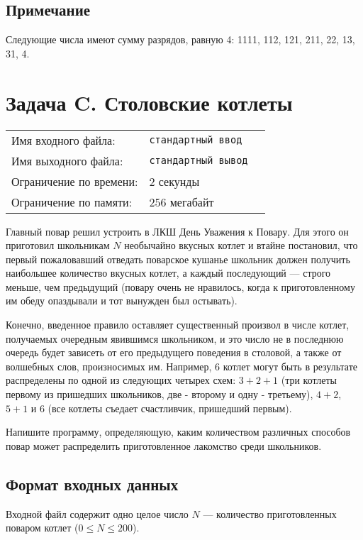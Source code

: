 \documentclass[12pt]{scrartcl}
\newcommand{\inputFile}{стандартный ввод}
\newcommand{\outputFile}{стандартный вывод}
\begin{document}
\subsection*{Примечание}
Следующие числа имеют сумму разрядов, равную 4: 1111, 112, 121, 211, 22, 13, 31, 4. 
\newpage

\section*{Задача C. Столовские котлеты}

\begin{tabularx}{\textwidth}{l l X}
    Имя входного файла: & \texttt{\inputFile} \\
    Имя выходного файла: & \texttt{\outputFile} \\
    Ограничение по времени: & $2$ секунды \\
    Ограничение по памяти: & $256$ мегабайт \\
\end{tabularx}

Главный повар решил устроить в ЛКШ День Уважения к Повару.
Для этого он приготовил школьникам $N$ необычайно вкусных котлет и втайне постановил,
что первый пожаловавший отведать поварское кушанье школьник должен получить
наибольшее количество вкусных котлет, а каждый последующий --- строго меньше,
чем предыдущий (повару очень не нравилось, когда к приготовленному им обеду опаздывали и тот вынужден был остывать).

Конечно, введенное правило оставляет существенный произвол в числе котлет,
получаемых очередным явившимся школьником, и это число не в последнюю очередь
будет зависеть от его предыдущего поведения в столовой,
а также от волшебных слов, произносимых им.
Например, 6 котлет могут быть в результате распределены по одной из следующих четырех схем:
$3 + 2 + 1$ (три котлеты первому из пришедших школьников, две - второму и одну - третьему),
$4 + 2$, $5 + 1$ и $6$ (все котлеты съедает счастливчик, пришедший первым). 

Напишите программу, определяющую, каким количеством различных способов повар может
распределить приготовленное лакомство среди школьников. 

\subsection*{Формат входных данных}
Входной файл содержит одно целое число $N$ --- количество приготовленных поваром котлет ($0 \le N \le 200$).
\end{document}
